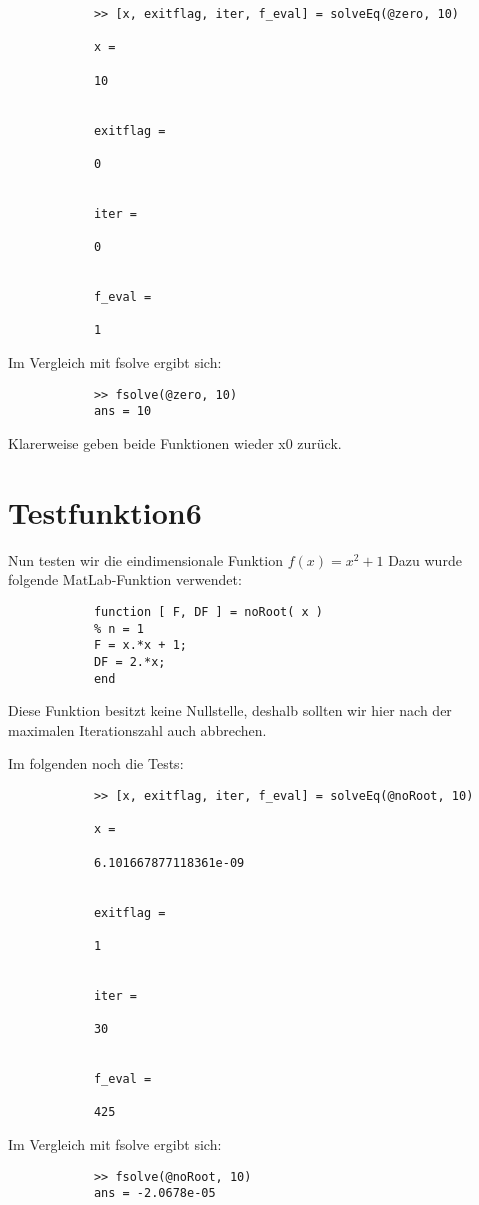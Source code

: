 \documentclass[11pt,titlepage]{article}
\begin{document}
		\begin{lstlisting}
			>> [x, exitflag, iter, f_eval] = solveEq(@zero, 10)
			
			x =
			
			10
			
			
			exitflag =
			
			0
			
			
			iter =
			
			0
			
			
			f_eval =
			
			1
		\end{lstlisting}
		
		Im Vergleich mit fsolve ergibt sich:
		
		\begin{lstlisting}
			>> fsolve(@zero, 10)
			ans = 10
		\end{lstlisting}
	
			Klarerweise geben beide Funktionen wieder x0 zurück.
	
	\section{Testfunktion6}
		Nun testen wir die eindimensionale Funktion $ f(x) = x^2 + 1$
		Dazu wurde folgende MatLab-Funktion verwendet:
		\begin{lstlisting}
			function [ F, DF ] = noRoot( x )
			% n = 1
			F = x.*x + 1;
			DF = 2.*x;
			end
		\end{lstlisting}
		Diese Funktion besitzt keine Nullstelle, deshalb sollten wir hier nach der maximalen Iterationszahl auch abbrechen.
	
		Im folgenden noch die Tests:
		
		\begin{lstlisting}
			>> [x, exitflag, iter, f_eval] = solveEq(@noRoot, 10)
			
			x =
			
			6.101667877118361e-09
			
			
			exitflag =
			
			1
			
			
			iter =
			
			30
			
			
			f_eval =
			
			425
		\end{lstlisting}
		
		Im Vergleich mit fsolve ergibt sich:
		
		\begin{lstlisting}
			>> fsolve(@noRoot, 10)
			ans = -2.0678e-05
		\end{lstlisting}
	
\end{document}
